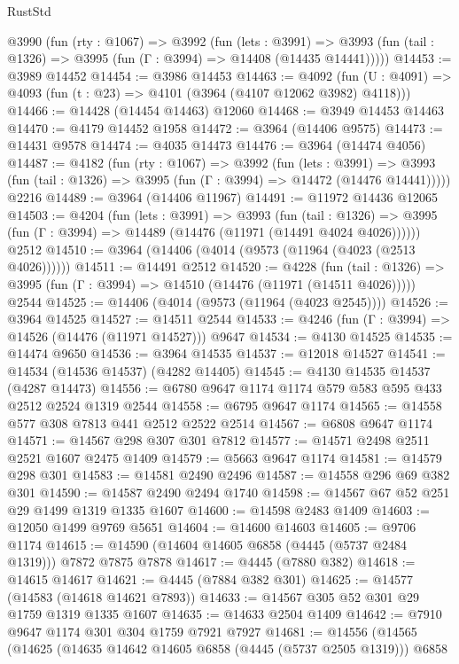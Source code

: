 \begin{lexlean}{RustStd}
\begin{coremodule}
{\begin{coremodule}
{{{{{{{{{{{{{{{{{{{{{{{{{{{{{{{{{{{{{{  @3990
    (fun (rty : @1067) =>
    @3992
      (fun (lets : @3991) =>
      @3993 (fun (tail : @1326) => @3995 (fun (Γ : @3994) => @14408 (@14435 @14441)))))
@14453 := @3989 @14452
@14454 := @3986 @14453
@14463 := @4092
    (fun (U : @4091) => @4093 (fun (t : @23) => @4101 (@3964 (@4107 @12062 @3982) @4118)))
@14466 := @14428 (@14454 @14463) @12060
@14468 := @3949 @14453 @14463
@14470 := @4179 @14452 @1958
@14472 := @3964 (@14406 @9575)
@14473 := @14431 @9578
@14474 := @4035 @14473
@14476 := @3964 (@14474 @4056)
@14487 := @4182
    (fun (rty : @1067) =>
    @3992
      (fun (lets : @3991) =>
      @3993 (fun (tail : @1326) => @3995 (fun (Γ : @3994) => @14472 (@14476 @14441)))))
    @2216
@14489 := @3964 (@14406 @11967)
@14491 := @11972 @14436 @12065
@14503 := @4204
    (fun (lets : @3991) =>
    @3993
      (fun (tail : @1326) =>
      @3995 (fun (Γ : @3994) => @14489 (@14476 (@11971 (@14491 @4024 @4026))))))
    @2512
@14510 := @3964 (@14406 (@4014 (@9573 (@11964 (@4023 (@2513 @4026))))))
@14511 := @14491 @2512
@14520 := @4228
    (fun (tail : @1326) => @3995 (fun (Γ : @3994) => @14510 (@14476 (@11971 (@14511 @4026)))))
    @2544
@14525 := @14406 (@4014 (@9573 (@11964 (@4023 @2545))))
@14526 := @3964 @14525
@14527 := @14511 @2544
@14533 := @4246 (fun (Γ : @3994) => @14526 (@14476 (@11971 @14527))) @9647
@14534 := @4130 @14525
@14535 := @14474 @9650
@14536 := @3964 @14535
@14537 := @12018 @14527
@14541 := @14534 (@14536 @14537) (@4282 @14405)
@14545 := @4130 @14535 @14537 (@4287 @14473)
@14556 := @6780 @9647 @1174 @1174 @579 @583 @595 @433 @2512 @2524 @1319 @2544
@14558 := @6795 @9647 @1174
@14565 := @14558 @577 @308 @7813 @441 @2512 @2522 @2514
@14567 := @6808 @9647 @1174
@14571 := @14567 @298 @307 @301 @7812
@14577 := @14571 @2498 @2511 @2521 @1607 @2475 @1409
@14579 := @5663 @9647 @1174
@14581 := @14579 @298 @301
@14583 := @14581 @2490 @2496
@14587 := @14558 @296 @69 @382 @301
@14590 := @14587 @2490 @2494 @1740
@14598 := @14567 @67 @52 @251 @29 @1499 @1319 @1335 @1607
@14600 := @14598 @2483 @1409
@14603 := @12050 @1499 @9769 @5651
@14604 := @14600 @14603
@14605 := @9706 @1174
@14615 := @14590 (@14604 @14605 @6858 (@4445 (@5737 @2484 @1319))) @7872 @7875 @7878
@14617 := @4445 (@7880 @382)
@14618 := @14615 @14617
@14621 := @4445 (@7884 @382 @301)
@14625 := @14577 (@14583 (@14618 @14621 @7893))
@14633 := @14567 @305 @52 @301 @29 @1759 @1319 @1335 @1607
@14635 := @14633 @2504 @1409
@14642 := @7910 @9647 @1174 @301 @304 @1759 @7921 @7927
@14681 := @14556
    (@14565
      (@14625
        (@14635 @14642 @14605 @6858 (@4445 (@5737 @2505 @1319)))
        @6858
}}}}}}}}}}}}}}}}}}}}}}}}}}}}}}}}}}}}}}
\end{coremodule}}
\end{coremodule}
\end{lexlean}
